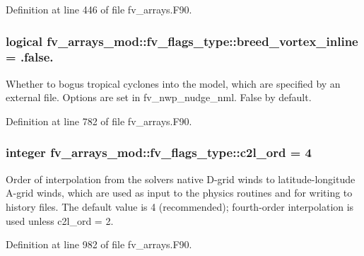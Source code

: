 Definition at line 446 of file fv\-\_\-arrays.\-F90.

\subsubsection[{breed\-\_\-vortex\-\_\-inline}]{\setlength{\rightskip}{0pt plus 5cm}logical fv\-\_\-arrays\-\_\-mod\-::fv\-\_\-flags\-\_\-type\-::breed\-\_\-vortex\-\_\-inline = .false.}\label{structfv__arrays__mod_1_1fv__flags__type_ad128b78fa6f0bb043f04a6b4207d14f2}


Whether to bogus tropical cyclones into the model, which are specified by an external file. Options are set in fv\-\_\-nwp\-\_\-nudge\-\_\-nml. False by default. 



Definition at line 782 of file fv\-\_\-arrays.\-F90.

\subsubsection[{c2l\-\_\-ord}]{\setlength{\rightskip}{0pt plus 5cm}integer fv\-\_\-arrays\-\_\-mod\-::fv\-\_\-flags\-\_\-type\-::c2l\-\_\-ord = 4}\label{structfv__arrays__mod_1_1fv__flags__type_a18295dfd8de10252dc53c6aa6113c5b1}


Order of interpolation from the solvers native D-\/grid winds to latitude-\/longitude A-\/grid winds, which are used as input to the physics routines and for writing to history files. The default value is 4 (recommended); fourth-\/order interpolation is used unless c2l\-\_\-ord = 2. 



Definition at line 982 of file fv\-\_\-arrays.\-F90.

